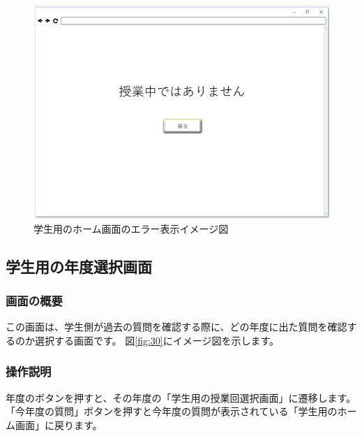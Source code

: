 \begin{figure}[htbp]
  \begin{center}
    \includegraphics[width=0.5\linewidth,clip]{./img/00.png}
    \caption{学生用のホーム画面のエラー表示イメージ図}\label{fig:00}
  \end{center}
\end{figure}

\newpage

\subsection{学生用の年度選択画面}
\subsubsection{画面の概要}
この画面は、学生側が過去の質問を確認する際に、どの年度に出た質問を確認するのか選択する画面です。
図\ref{fig:30}にイメージ図を示します。

\subsubsection{操作説明}
年度のボタンを押すと、その年度の「学生用の授業回選択画面」に遷移します。
「今年度の質問」ボタンを押すと今年度の質問が表示されている「学生用のホーム画面」に戻ります。



